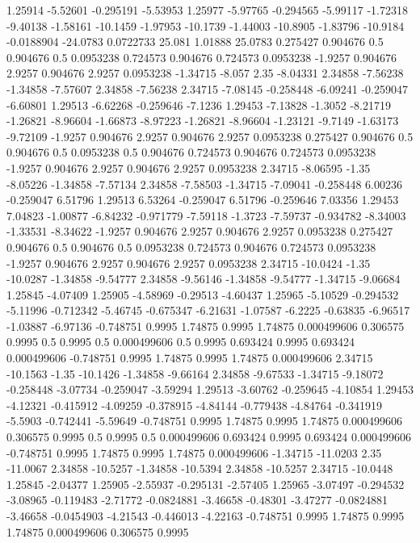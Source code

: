 1.25914 -5.52601
-0.295191 -5.53953
1.25977 -5.97765
-0.294565 -5.99117
-1.72318 -9.40138
-1.58161 -10.1459
-1.97953 -10.1739
-1.44003 -10.8905
-1.83796 -10.9184
-0.0188904 -24.0783
0.0722733 25.081
1.01888 25.0783
0.275427 0.904676
0.5 0.904676
0.5 0.0953238
0.724573 0.904676
0.724573 0.0953238
-1.9257 0.904676
2.9257 0.904676
2.9257 0.0953238
-1.34715 -8.057
2.35 -8.04331
2.34858 -7.56238
-1.34858 -7.57607
2.34858 -7.56238
2.34715 -7.08145
-0.258448 -6.09241
-0.259047 -6.60801
1.29513 -6.62268
-0.259646 -7.1236
1.29453 -7.13828
-1.3052 -8.21719
-1.26821 -8.96604
-1.66873 -8.97223
-1.26821 -8.96604
-1.23121 -9.7149
-1.63173 -9.72109
-1.9257 0.904676
2.9257 0.904676
2.9257 0.0953238
0.275427 0.904676
0.5 0.904676
0.5 0.0953238
0.5 0.904676
0.724573 0.904676
0.724573 0.0953238
-1.9257 0.904676
2.9257 0.904676
2.9257 0.0953238
2.34715 -8.06595
-1.35 -8.05226
-1.34858 -7.57134
2.34858 -7.58503
-1.34715 -7.09041
-0.258448 6.00236
-0.259047 6.51796
1.29513 6.53264
-0.259047 6.51796
-0.259646 7.03356
1.29453 7.04823
-1.00877 -6.84232
-0.971779 -7.59118
-1.3723 -7.59737
-0.934782 -8.34003
-1.33531 -8.34622
-1.9257 0.904676
2.9257 0.904676
2.9257 0.0953238
0.275427 0.904676
0.5 0.904676
0.5 0.0953238
0.724573 0.904676
0.724573 0.0953238
-1.9257 0.904676
2.9257 0.904676
2.9257 0.0953238
2.34715 -10.0424
-1.35 -10.0287
-1.34858 -9.54777
2.34858 -9.56146
-1.34858 -9.54777
-1.34715 -9.06684
1.25845 -4.07409
1.25905 -4.58969
-0.29513 -4.60437
1.25965 -5.10529
-0.294532 -5.11996
-0.712342 -5.46745
-0.675347 -6.21631
-1.07587 -6.2225
-0.63835 -6.96517
-1.03887 -6.97136
-0.748751 0.9995
1.74875 0.9995
1.74875 0.000499606
0.306575 0.9995
0.5 0.9995
0.5 0.000499606
0.5 0.9995
0.693424 0.9995
0.693424 0.000499606
-0.748751 0.9995
1.74875 0.9995
1.74875 0.000499606
2.34715 -10.1563
-1.35 -10.1426
-1.34858 -9.66164
2.34858 -9.67533
-1.34715 -9.18072
-0.258448 -3.07734
-0.259047 -3.59294
1.29513 -3.60762
-0.259645 -4.10854
1.29453 -4.12321
-0.415912 -4.09259
-0.378915 -4.84144
-0.779438 -4.84764
-0.341919 -5.5903
-0.742441 -5.59649
-0.748751 0.9995
1.74875 0.9995
1.74875 0.000499606
0.306575 0.9995
0.5 0.9995
0.5 0.000499606
0.693424 0.9995
0.693424 0.000499606
-0.748751 0.9995
1.74875 0.9995
1.74875 0.000499606
-1.34715 -11.0203
2.35 -11.0067
2.34858 -10.5257
-1.34858 -10.5394
2.34858 -10.5257
2.34715 -10.0448
1.25845 -2.04377
1.25905 -2.55937
-0.295131 -2.57405
1.25965 -3.07497
-0.294532 -3.08965
-0.119483 -2.71772
-0.0824881 -3.46658
-0.48301 -3.47277
-0.0824881 -3.46658
-0.0454903 -4.21543
-0.446013 -4.22163
-0.748751 0.9995
1.74875 0.9995
1.74875 0.000499606
0.306575 0.9995
